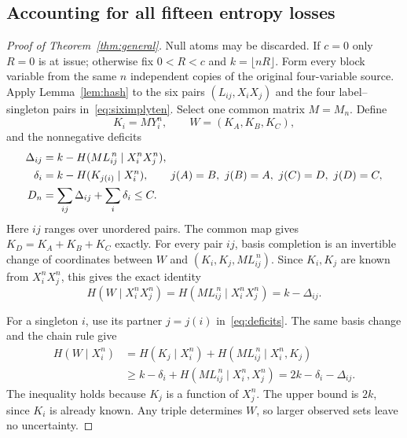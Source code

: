 \subsection{Accounting for all fifteen entropy losses}
\begin{proof}[Proof of Theorem~\ref{thm:general}]
Null atoms may be discarded. If $c=0$ only $R=0$ is at issue; otherwise
fix $0<R<c$ and $k=\lfloor nR\rfloor$.
Form every block variable from the same $n$ independent copies of the
original four-variable source.
Apply Lemma~\ref{lem:hash} to the six pairs $(L_{ij},X_iX_j)$ and the
four label--singleton pairs in~\eqref{eq:siximplyten}. Select one common
matrix $M=M_n$. Define
\[
 K_i=MY_i^n,\qquad W=(K_A,K_B,K_C),
\]
and the nonnegative deficits
\begin{align}
 \Delta_{ij}&=k-H(ML_{ij}^{\,n}\mid X_i^nX_j^n),\notag\\
 \delta_i&=k-H(K_{j(i)}\mid X_i^n),\qquad
 j(A)=B,\ j(B)=A,\ j(C)=D,\ j(D)=C,\label{eq:deficits}\\
 D_n&=\sum_{ij}\Delta_{ij}+\sum_i\delta_i\le C.\notag
\end{align}
Here $ij$ ranges over unordered pairs.
The common map gives $K_D=K_A+K_B+K_C$ exactly.
For every pair $ij$, basis completion is an invertible change of
coordinates between $W$ and $(K_i,K_j,ML_{ij}^{\,n})$.
Since $K_i,K_j$ are known from $X_i^nX_j^n$, this gives the exact identity
\begin{equation}\label{eq:pairs}
 H(W\mid X_i^nX_j^n)=H(ML_{ij}^{\,n}\mid X_i^nX_j^n)=k-\Delta_{ij}.
\end{equation}

For a singleton $i$, use its partner $j=j(i)$ in~\eqref{eq:deficits}.
The same basis change and the chain rule give
\begin{align*}
 H(W\mid X_i^n)
 &=H(K_j\mid X_i^n)+H(ML_{ij}^{\,n}\mid X_i^n,K_j)\\
 &\ge k-\delta_i+H(ML_{ij}^{\,n}\mid X_i^n,X_j^n)
 =2k-\delta_i-\Delta_{ij}.
\end{align*}
The inequality holds because $K_j$ is a function of $X_j^n$.
The upper bound is $2k$, since $K_i$ is already known.
Any triple determines $W$, so larger observed sets leave no uncertainty.


\end{proof}
